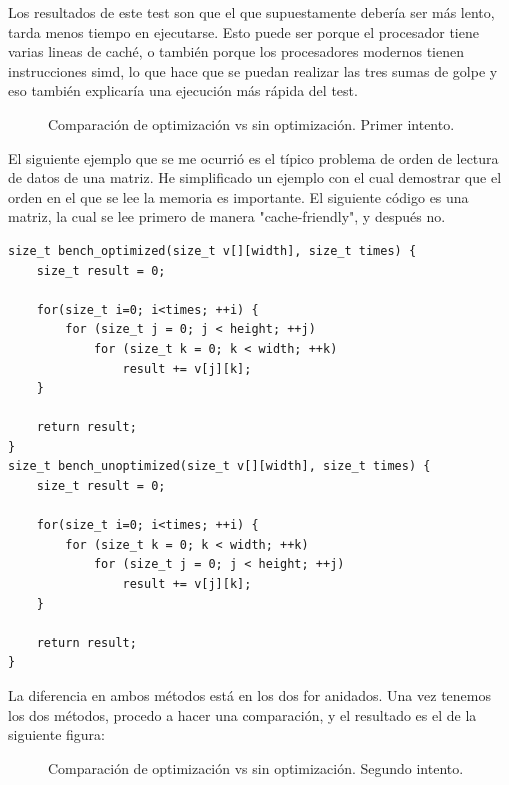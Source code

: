 Los resultados de este test son que el que supuestamente debería ser más lento, tarda menos tiempo en ejecutarse. Esto puede ser porque el procesador tiene varias lineas de caché, o también porque los procesadores modernos tienen instrucciones \gls{simd}, lo que hace que se puedan realizar las tres sumas de golpe y eso también explicaría una ejecución más rápida del test.
\begin{figure}[H]
	\centering
	\caption{Comparación de optimización vs sin optimización. Primer intento.}
\end{figure}

El siguiente ejemplo que se me ocurrió es el típico problema de orden de lectura de datos de una matriz. He simplificado un ejemplo con el cual demostrar que el orden en el que se lee la memoria es importante. El siguiente código es una matriz, la cual se lee primero de manera "cache-friendly", y después no.
\begin{lstlisting}[style=C-color, caption={Caché optimizada vs sin optimizar. Segundo intento},label=cache-optimization-second]
size_t bench_optimized(size_t v[][width], size_t times) {
	size_t result = 0;
	
	for(size_t i=0; i<times; ++i) {
		for (size_t j = 0; j < height; ++j) 
			for (size_t k = 0; k < width; ++k)
				result += v[j][k];
	}
	
	return result;
}
size_t bench_unoptimized(size_t v[][width], size_t times) {
	size_t result = 0;
	
	for(size_t i=0; i<times; ++i) {
		for (size_t k = 0; k < width; ++k) 
			for (size_t j = 0; j < height; ++j) 
				result += v[j][k];
	}
	
	return result;
}
\end{lstlisting}

La diferencia en ambos métodos está en los dos for anidados. Una vez tenemos los dos métodos, procedo a hacer una comparación, y el resultado es el de la siguiente figura:
\begin{figure}[H]
	\centering
	\caption{Comparación de optimización vs sin optimización. Segundo intento.}
\end{figure}

